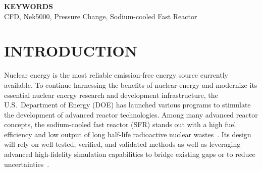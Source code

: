 \documentclass[11pt,letterpaper,english]{article}
\begin{document}
\begin{flushleft}
{\bf KEYWORDS} \\
 CFD, Nek5000, Pressure Change, Sodium-cooled Fast Reactor
\end{flushleft}

\section{INTRODUCTION}

Nuclear energy is the most reliable emission-free energy source currently available. 
To continue harnessing the benefits of nuclear energy and modernize its essential nuclear energy research and development infrastructure, the U.S.\ Department of Energy (DOE) has launched various programs to stimulate the development of advanced reactor technologies. 
Among many advanced reactor concepts, the sodium-cooled fast reactor (SFR) stands out with a high fuel efficiency and low output of long half-life radioactive nuclear wastes~\citep{Shaver2019a}. 
Its design will rely on well-tested, verified, and validated methods as well as leveraging advanced high-fidelity simulation capabilities to bridge existing gaps or to reduce uncertainties~\citep{Shaver2019b}. 
\end{document}
